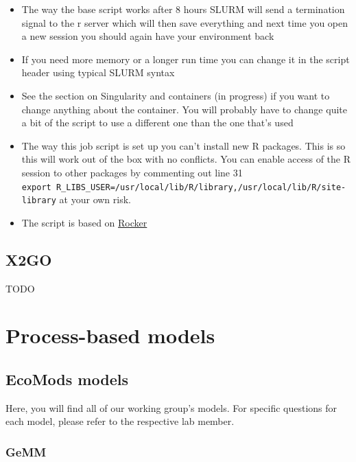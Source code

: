 \documentclass[
]{book}
\providecommand{\tightlist}{%
  \setlength{\itemsep}{0pt}\setlength{\parskip}{0pt}}
\begin{document}
\begin{itemize}
\tightlist
\item
  The way the base script works after 8 hours SLURM will send a
  termination signal to the r server which will then save everything
  and next time you open a new session you should again have your
  environment back\\
\item
  If you need more memory or a longer run time you can change it in
  the script header using typical SLURM syntax\\
\item
  See the section on Singularity and containers (in progress) if you
  want to change anything about the container. You will probably have
  to change quite a bit of the script to use a different one than the
  one that's used
\item
  The way this job script is set up you can't install new R packages.
  This is so this will work out of the box with no conflicts. You can
  enable access of the R session to other packages by commenting out
  line 31
  \texttt{export\ R\_LIBS\_USER=/usr/local/lib/R/library,/usr/local/lib/R/site-library}
  at your own risk.
\item
  The script is based on
  \href{https://www.rocker-project.org/use/singularity/}{Rocker}
\end{itemize}

\section{X2GO}\label{x2go}

TODO

\chapter{Process-based models}\label{process-based-models}

\section{EcoMods models}\label{ecomods-models}

Here, you will find all of our working group's models. For specific
questions for each model, please refer to the respective lab member.

\subsection{GeMM}\label{gemm}
\end{document}
